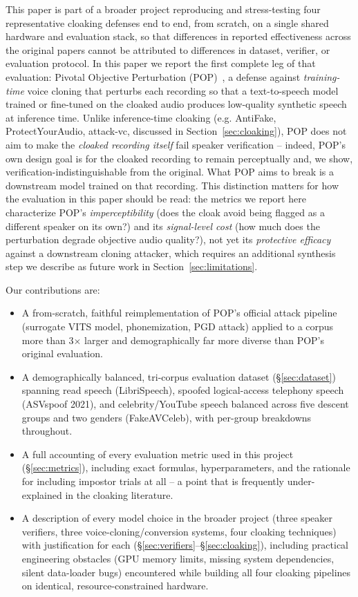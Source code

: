 \documentclass[11pt]{article}
\begin{document}
This paper is part of a broader project reproducing and stress-testing
four representative cloaking defenses end to end, from scratch, on a
single shared hardware and evaluation stack, so that differences in
reported effectiveness across the original papers cannot be attributed
to differences in dataset, verifier, or evaluation protocol. In this
paper we report the first complete leg of that evaluation: Pivotal
Objective Perturbation (POP)~\cite{zhang2024mitigating}, a defense
against \emph{training-time} voice cloning that perturbs each
recording so that a text-to-speech model trained or fine-tuned on the
cloaked audio produces low-quality synthetic speech at inference time.
Unlike inference-time cloaking (e.g. AntiFake, ProtectYourAudio,
attack-vc, discussed in Section~\ref{sec:cloaking}), POP does not aim
to make the \emph{cloaked recording itself} fail speaker verification
-- indeed, POP's own design goal is for the cloaked recording to
remain perceptually and, we show, verification-indistinguishable from
the original. What POP aims to break is a downstream model trained on
that recording. This distinction matters for how the evaluation in
this paper should be read: the metrics we report here characterize
POP's \emph{imperceptibility} (does the cloak avoid being flagged as
a different speaker on its own?) and its \emph{signal-level cost}
(how much does the perturbation degrade objective audio quality?), not
yet its \emph{protective efficacy} against a downstream cloning
attacker, which requires an additional synthesis step we describe as
future work in Section~\ref{sec:limitations}.

Our contributions are:
\begin{itemize}
  \item A from-scratch, faithful reimplementation of POP's official
    attack pipeline (surrogate VITS model, phonemization, PGD attack)
    applied to a corpus more than 3$\times$ larger and demographically
    far more diverse than POP's original evaluation.
  \item A demographically balanced, tri-corpus evaluation dataset
    (\S\ref{sec:dataset}) spanning read speech (LibriSpeech), spoofed
    logical-access telephony speech (ASVspoof 2021), and
    celebrity/YouTube speech balanced across five descent groups and
    two genders (FakeAVCeleb), with per-group breakdowns throughout.
  \item A full accounting of every evaluation metric used in this
    project (\S\ref{sec:metrics}), including exact formulas,
    hyperparameters, and the rationale for including impostor trials
    at all -- a point that is frequently under-explained in the
    cloaking literature.
  \item A description of every model choice in the broader project
    (three speaker verifiers, three voice-cloning/conversion systems,
    four cloaking techniques) with justification for each
    (\S\ref{sec:verifiers}--\S\ref{sec:cloaking}), including practical
    engineering obstacles (GPU memory limits, missing system
    dependencies, silent data-loader bugs) encountered while building
    all four cloaking pipelines on identical, resource-constrained
    hardware.
\end{itemize}
\end{document}
